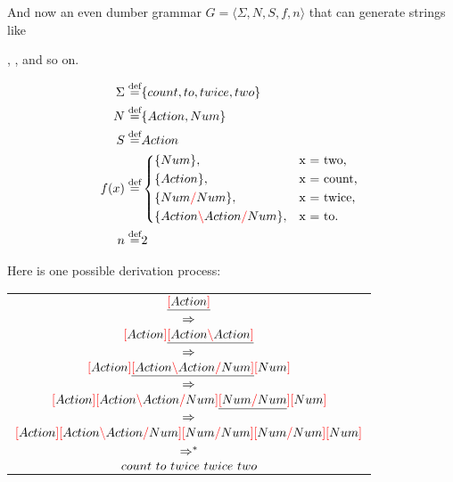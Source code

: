 \documentclass[main.tex]{subfiles}
\begin{document}
\begin{example}
    \label{ex:derivsimple}

    And now an even dumber grammar $G = \langle \Sigma, N, S, f, n \rangle$
    that can generate strings like

    ,
    , 
    and so on.

    \begin{align*}
        \Sigma \defeq& \{ count, to, twice, two \} \\
        N \defeq& \{ Action, Num \} \\
        S \defeq& Action \\
        f(x) \defeq&
            \begin{cases*}
                \{ Num \},& x = two, \\
                \{ Action \},& x = count, \\
                \{ Num \rc Num \},& x = twice, \\
                \{ Action \lc Action \rc Num \},& x = to. \\
            \end{cases*} \\
        n \defeq& 2 \\
    \end{align*}

    Here is one possible derivation process:
    \begin{center}
        \begin{tabular}{c}
            $\underline{\textcolor{red}{[} Action \textcolor{red}{]}}$ \\ $\Rightarrow$ \\
            $\textcolor{red}{[} Action \textcolor{red}{]} \underline{\textcolor{red}{[} Action \textcolor{red}{\backslash} Action \textcolor{red}{]}}$ \\ $\Rightarrow$ \\
            $\textcolor{red}{[} Action \textcolor{red}{]} \underline{\textcolor{red}{[} Action \textcolor{red}{\backslash} Action \textcolor{red}{/} Num \textcolor{red}{]}} \textcolor{red}{[} Num \textcolor{red}{]}$ \\ $\Rightarrow$ \\
            $\textcolor{red}{[} Action \textcolor{red}{]} \textcolor{red}{[} Action \textcolor{red}{\backslash} Action \textcolor{red}{/} Num \textcolor{red}{]} \underline{\textcolor{red}{[} Num \textcolor{red}{/} Num} \textcolor{red}{]} \textcolor{red}{[} Num \textcolor{red}{]}$ \\ $\Rightarrow$ \\
            $\textcolor{red}{[} Action \textcolor{red}{]} \textcolor{red}{[} Action \textcolor{red}{\backslash} Action \textcolor{red}{/} Num \textcolor{red}{]} \textcolor{red}{[} Num \textcolor{red}{/} Num \textcolor{red}{]} \textcolor{red}{[} Num \textcolor{red}{/} Num \textcolor{red}{]} \textcolor{red}{[} Num \textcolor{red}{]}$ \\ $\Rightarrow^*$ \\
            $count \text{ } to \text{ } twice \text{ } twice \text{ } two$ \\
        \end{tabular}
    \end{center}
\end{example}
\end{document}
